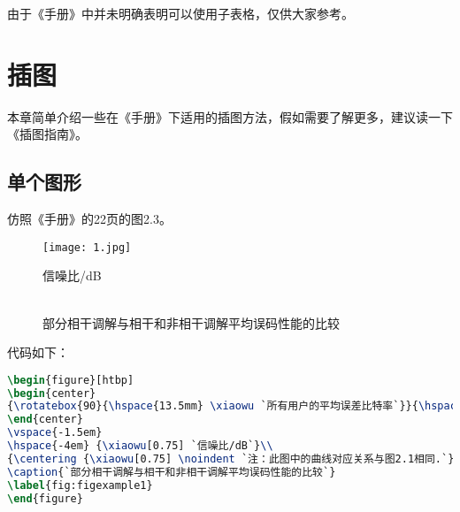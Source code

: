 由于《手册》中并未明确表明可以使用子表格，仅供大家参考。

\section{插图}
本章简单介绍一些在《手册》下适用的插图方法，假如需要了解更多，建议读一下《\LaTeXe 插图指南》。

\subsection{单个图形}
仿照《手册》的22页的图2.3。

\begin{figure}[htbp]
\begin{center}
{}{\hspace{15mm}\texttt{[image: 1.jpg]}}{\hspace*{20mm}}
\end{center}
\vspace{-1.5em}
\hspace{-4em} {\xiaowu[0.75] 信噪比/dB}\\
{\\}
\caption{部分相干调解与相干和非相干调解平均误码性能的比较}
\label{fig:figexample1}
\end{figure}

代码如下：

\begin{lstlisting}[language=TeX]
\begin{figure}[htbp]
\begin{center}
{\rotatebox{90}{\hspace{13.5mm} \xiaowu `所有用户的平均误差比特率`}}{\hspace{15mm}\texttt{[image: 1.jpg]}}{\hspace*{20mm}}
\end{center}
\vspace{-1.5em}
\hspace{-4em} {\xiaowu[0.75] `信噪比/dB`}\\
{\centering {\xiaowu[0.75] \noindent `注：此图中的曲线对应关系与图2.1相同.`}\\}
\caption{`部分相干调解与相干和非相干调解平均误码性能的比较`}
\label{fig:figexample1}
\end{figure}
\end{lstlisting}

